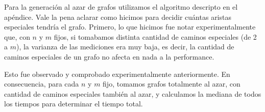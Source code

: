 Para la generación al azar de grafos utilizamos el algoritmo descripto en el apéndice. Vale la pena aclarar como hicimos para decidir cuántas aristas especiales tendría el grafo. Primero, lo que hicimos fue notar experimentalmente que, con $n$ y $m$ fijos, si tomabamos distinta cantidad de caminos especiales (de 2 a $m$), la varianza de las mediciones era muy baja, es decir, la cantidad de caminos especiales de un grafo no afecta en nada a la performance. 

Esto fue observado y comprobado experimentalmente anteriormente. En consecuencia, para cada $n$ y $m$ fijo, tomamos grafos totalmente al azar, con cantidad de caminos especiales también al azar, y calculamos la mediana de todos los tiempos para determinar el tiempo total.
